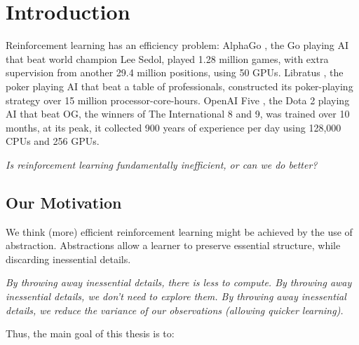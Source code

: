 \chapter{Introduction}\label{C:intro}

Reinforcement learning has an efficiency problem: AlphaGo \cite{Silver2016a}, the Go
playing AI that beat world champion Lee Sedol, played 1.28 million games, with
extra supervision from another 29.4 million positions, using 50 GPUs.
Libratus \cite{Brown2018b}, the poker playing AI that beat a table of professionals,
constructed its poker-playing strategy over 15 million processor-core-hours.
OpenAI Five \cite{Berner2019}, the Dota 2 playing AI that beat OG, the winners of The International 8 and 9, was
trained over 10 months, at its peak, it collected 900 years of experience per day using
128,000 CPUs and 256 GPUs.

\begin{displayquote}
\textit{Is reinforcement learning fundamentally inefficient, or can we do better?}
\end{displayquote}


\section{Our Motivation}

We think (more) efficient reinforcement learning might be achieved by the use of abstraction.
Abstractions allow a learner to preserve essential structure, while discarding inessential details.

\begin{displayquote}
\textit{By throwing away inessential details, there is less to compute. \newline
By throwing away inessential details, we don't need to explore them. \newline
By throwing away inessential details, we reduce the variance of our \newline
observations (allowing quicker learning).}
\end{displayquote}

%
%
%

Thus, the main goal of this thesis is to:

